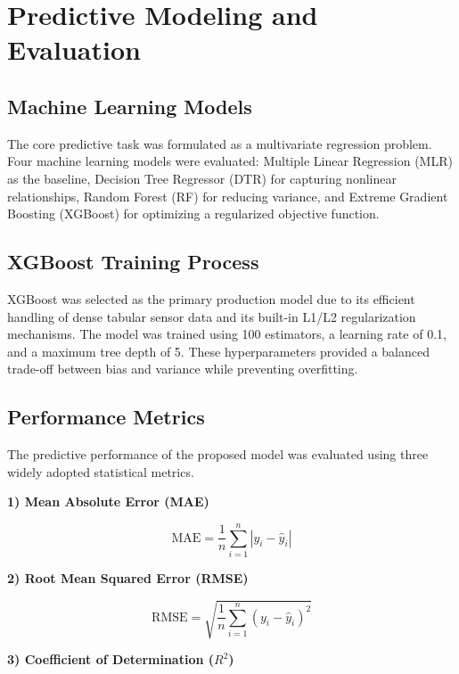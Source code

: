 \documentclass[conference]{IEEEtran}
\begin{document}
\section{Predictive Modeling and Evaluation}

\subsection{Machine Learning Models}

The core predictive task was formulated as a multivariate
regression problem. Four machine learning models were
evaluated: Multiple Linear Regression (MLR) as the baseline,
Decision Tree Regressor (DTR) for capturing nonlinear
relationships, Random Forest (RF) for reducing variance, and
Extreme Gradient Boosting (XGBoost) for optimizing a
regularized objective function.

\subsection{XGBoost Training Process}

XGBoost was selected as the primary production model due to
its efficient handling of dense tabular sensor data and its
built-in L1/L2 regularization mechanisms. The model was
trained using 100 estimators, a learning rate of 0.1, and a
maximum tree depth of 5. These hyperparameters provided a
balanced trade-off between bias and variance while preventing
overfitting.

\subsection{Performance Metrics}

The predictive performance of the proposed model was
evaluated using three widely adopted statistical metrics.

\textbf{1) Mean Absolute Error (MAE)}

\begin{equation}
\mathrm{MAE}
=
\frac{1}{n}
\sum_{i=1}^{n}
\left|y_i-\hat{y}_i\right|
\end{equation}

\textbf{2) Root Mean Squared Error (RMSE)}

\begin{equation}
\mathrm{RMSE}
=
\sqrt{
\frac{1}{n}
\sum_{i=1}^{n}
\left(y_i-\hat{y}_i\right)^2
}
\end{equation}

\textbf{3) Coefficient of Determination ($R^2$)}
\end{document}
